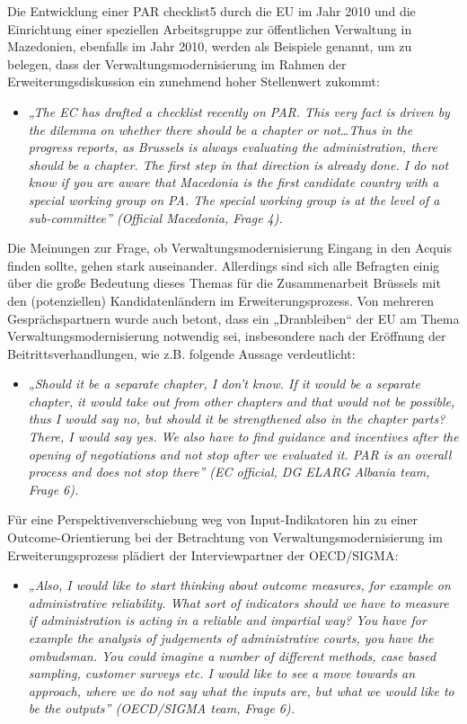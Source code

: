 Die Entwicklung einer PAR checklist5 durch die EU im Jahr 2010 und die Einrichtung einer speziellen Arbeitsgruppe zur öffentlichen Verwaltung in Mazedonien, ebenfalls im Jahr 2010, werden als Beispiele genannt, um zu belegen, dass der Verwaltungsmodernisierung im Rahmen der Erweiterungsdiskussion ein zunehmend hoher Stellenwert zukommt:

\begin{itemize}[label={}]
\item \textit{„The EC has drafted a checklist recently on PAR. This very fact is driven by the dilemma on whether there should be a chapter or not…Thus in the progress reports, as Brussels is always evaluating the administration, there should be a chapter. The first step in that direction is already done. I do not know if you are aware that Macedonia is the first candidate country with a special working group on PA. The special working group is at the level of a sub-committee” (Official Macedonia, Frage 4).}
\end{itemize}

Die Meinungen zur Frage, ob Verwaltungsmodernisierung Eingang in den Acquis finden sollte, gehen stark auseinander. Allerdings sind sich alle Befragten einig über die große Bedeutung dieses Themas für die Zusammenarbeit Brüssels mit den (potenziellen) Kandidatenländern im Erweiterungsprozess. Von mehreren Gesprächspartnern wurde auch betont, dass ein „Dranbleiben“ der EU am Thema Verwaltungsmodernisierung notwendig sei, insbesondere nach der Eröffnung der Beitrittsverhandlungen, wie z.B. folgende Aussage verdeutlicht:

\begin{itemize}[label={}]
\item \textit{„Should it be a separate chapter, I don’t know. If it would be a separate chapter, it would take out from other chapters and that would not be possible, thus I would say no, but should it be strengthened also in the chapter parts? There, I would say yes. We also have to find guidance and incentives after the opening of negotiations and not stop after we evaluated it. PAR is an overall process and does not stop there” (EC official, DG ELARG Albania team, Frage 6).}
\end{itemize}

Für eine Perspektivenverschiebung weg von Input-Indikatoren hin zu einer Outcome-Orientierung bei der Betrachtung von Verwaltungsmodernisierung im Erweiterungsprozess plädiert der Interviewpartner der OECD/SIGMA:

\begin{itemize}[label={}]
\item \textit{„Also, I would like to start thinking about outcome measures, for example on administrative reliability. What sort of indicators should we have to measure if administration is acting in a reliable and impartial way? You have for example the analysis of judgements of administrative courts, you have the ombudsman. You could imagine a number of different methods, case based sampling, customer surveys etc. I would like to see a move towards an approach, where we do not say what the inputs are, but what we would like to be the outputs” (OECD/SIGMA team, Frage 6).}
\end{itemize}


